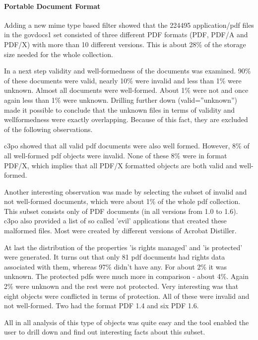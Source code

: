\paragraph{Portable Document Format}
Adding a new mime type based filter showed that the 224495 application/pdf files in the govdocs1 set consisted of three different PDF formats (PDF, PDF/A and PDF/X) with more than 10 different versions.
This is about 28\% of the storage size  needed for the whole collection.

In a next step validity and well-formedness of the documents was examined.
90\% of these documents were valid, nearly 10\% were invalid and less than 1\% were unknown.
Almost all documents were well-formed. About 1\% were not and once again less than 1\% were unknown.
Drilling further down (valid=''unknown'') made it possible to conclude that  the unknown files in terms of validity and wellformedness were exactly overlapping.
Because of this fact, they are excluded of the following observations.

c3po showed that all valid pdf documents were also well formed.
However, 8\% of all well-formed pdf objects were invalid.
None of these 8\% were in format PDF/X, which implies that all PDF/X formatted objects are both valid and well-formed.

Another interesting observation was made by selecting the subset of invalid and not well-formed documents, which were about 1\% of the whole pdf collection.
This subset consists only of PDF documents (in all versions from 1.0 to 1.6).
c3po also provided a list of so called 'evil' applications that created these malformed files.
Most were created by different versions of Acrobat Distiller.

At last the distribution of the properties 'is rights managed' and 'is protected' were generated.
It turns out that only 81 pdf documents had rights data associated with them, whereas 97\% didn't have any.
For about 2\% it was unknown.
The protected pdfs were much more in comparison - about 4\%.
Again 2\% were unknown and the rest were not protected.
Very interesting was that eight objects were conflicted in terms of protection.
All of these were invalid and not well-formed. Two had the format PDF 1.4 and six PDF 1.6.

All in all analysis of this type of objects was quite easy and the tool enabled the user to drill down and find out interesting facts about this subset.

